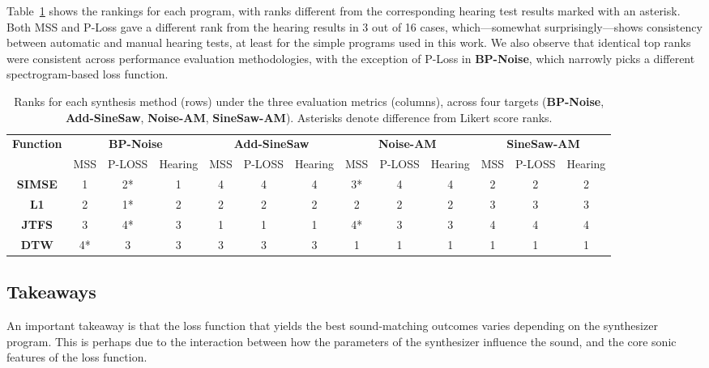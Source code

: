 \documentclass[lettersize,journal]{IEEEtran}
\newcommand{\BPNoise}{\textbf{BP-Noise}}
\newcommand{\AddSineSaw}{\textbf{Add-SineSaw}}
\newcommand{\AmpMod}{\textbf{Noise-AM}}
\newcommand{\FMMod}{\textbf{SineSaw-AM}}
\begin{document}
Table~\ref{tab:combined_ranks} shows the rankings for each program, with ranks different from the corresponding hearing test results marked with an asterisk. Both MSS and P-Loss gave a different rank from the hearing results in 3 out of 16 cases, which---somewhat surprisingly---shows consistency between automatic and manual hearing tests, at least for the simple programs used in this work. We also observe that identical top ranks were consistent across performance evaluation methodologies, with the exception of P-Loss in \BPNoise, which narrowly picks a different spectrogram-based loss function.
% 
\begin{table}[htbp]
\centering
\caption{Ranks for each synthesis method (rows) under the three evaluation metrics (columns), across four targets (\BPNoise, \AddSineSaw, \AmpMod, \FMMod). Asterisks denote difference from Likert score ranks.}
\footnotesize
\begin{tabular}{|c|ccc|ccc|ccc|ccc|}
\hline
\textbf{Function} 
  & \multicolumn{3}{c|}{\BPNoise}
  & \multicolumn{3}{c|}{\AddSineSaw}
  & \multicolumn{3}{c|}{\AmpMod}
  & \multicolumn{3}{c|}{\FMMod} \\
\cline{2-13}
  & MSS & P-LOSS & Hearing 
  & MSS & P-LOSS & Hearing 
  & MSS & P-LOSS & Hearing 
  & MSS & P-LOSS & Hearing \\
\hline
\textbf{SIMSE} 
  & 1    & 2*   & 1    
  & 4    & 4    & 4    
  & 3*   & 4    & 4    
  & 2    & 2    & 2    \\
\textbf{L1}    
  & 2    & 1*   & 2    
  & 2    & 2    & 2    
  & 2    & 2    & 2    
  & 3    & 3    & 3    \\
\textbf{JTFS}  
  & 3    & 4*   & 3    
  & 1   & 1    & 1    
  & 4*   & 3    & 3    
  & 4    & 4    & 4    \\
\textbf{DTW}   
  & 4*   & 3    & 3    
  & 3    & 3    & 3    
  & 1    & 1    & 1    
  & 1    & 1    & 1    \\
\hline
\end{tabular}

\label{tab:combined_ranks}
\end{table}


\subsection{Takeaways}
An important takeaway is that the loss function that yields the best sound-matching outcomes varies depending on the synthesizer program. This is perhaps due to the interaction between how the parameters of the synthesizer influence the sound, and the core sonic features of the loss function.
\end{document}
